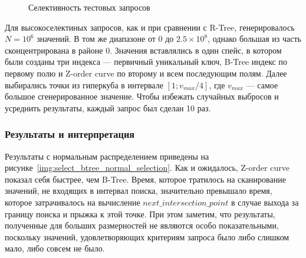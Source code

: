 \begin{figure}
	\centering
	\caption{Селективность тестовых запросов}
\end{figure}

Для высокоселектиных запросов, как и при сравнении с R-Tree, генерировалось $N = 10^6$ значений.
В том же диапазоне от $0$ до $2.5 \times 10^8$, однако большая из часть сконцентрирована в районе 0.
Значения вставлялись в один спейс, в котором были созданы три индекса ---
первичный уникальный ключ, B-Tree индекс по первому полю и Z-order curve по второму и всем последующим полям.
Далее выбирались точки из гиперкуба в интервале $[1; v_{max}/4]$, где $v_{max}$ --- самое большое
сгенерированное значение.
Чтобы избежать случайных выбросов и усреднить результаты, каждый запрос был сделан 10 раз.

\subsubsection{Результаты и интерпретация}
Результаты с нормальным распределением приведены на рисунке~\ref{img:select_btree_normal_selection}.
Как и ожидалось, Z-order curve показал себя быстрее, чем B-Tree.
Время, которое тратилось на сканирование значений, не входящих в интервал поиска,
значительно превышало время, которое затрачивалось на вычисление $next\_intersection\_point$
в случае выхода за границу поиска и прыжка к этой точке.
При этом заметим, что результаты, полученные для больших размерностей не являются особо показательными,
поскольку значений, удовлетворяющих критериям запроса было либо слишком мало,
либо совсем не было.

